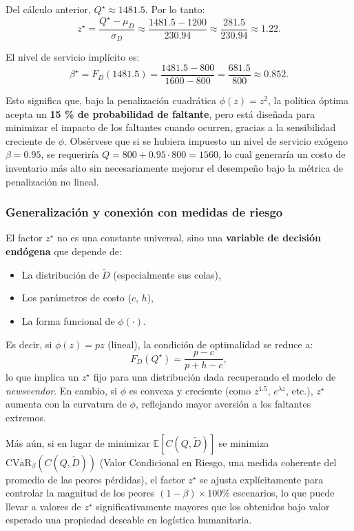 \documentclass[
  spanish,
  us-letterpaper,
]{scrreprt}
\providecommand{\tightlist}{%
  \setlength{\itemsep}{0pt}\setlength{\parskip}{0pt}}
\numberwithin{equation}{section}
\begin{document}
Del cálculo anterior, \(Q^\star \approx 1481.5\). Por lo tanto: \[
z^\star = \frac{Q^\star - \mu_D}{\sigma_D} \approx \frac{1481.5 - 1200}{230.94} \approx \frac{281.5}{230.94} \approx 1.22.
\]

El nivel de servicio implícito es: \[
\beta^\star = F_D(1481.5) = \frac{1481.5 - 800}{1600 - 800} = \frac{681.5}{800} \approx 0.852.
\]

Esto significa que, bajo la penalización cuadrática \(\phi(z) = z^2\),
la política óptima acepta un \textbf{15 \% de probabilidad de faltante},
pero está diseñada para minimizar el impacto de los faltantes cuando
ocurren, gracias a la sensibilidad creciente de \(\phi\). Obsérvese que
si se hubiera impuesto un nivel de servicio exógeno \(\beta = 0.95\), se
requeriría \(Q = 800 + 0.95 \cdot 800 = 1560\), lo cual generaría un
costo de inventario más alto sin necesariamente mejorar el desempeño
bajo la métrica de penalización no lineal.

\subsubsection{Generalización y conexión con medidas de
riesgo}\label{generalizaciuxf3n-y-conexiuxf3n-con-medidas-de-riesgo}

El factor \(z^\star\) no es una constante universal, sino una
\textbf{variable de decisión endógena} que depende de:

\begin{itemize}
\tightlist
\item
  La distribución de \(\tilde{D}\) (especialmente sus colas),
\item
  Los parámetros de costo (\(c\), \(h\)),
\item
  La forma funcional de \(\phi(\cdot)\).
\end{itemize}

Es decir, si \(\phi(z) = p z\) (lineal), la condición de optimalidad se
reduce a: \[
F_D(Q^\star) = \frac{p - c}{p + h - c},
\] lo que implica un \(z^\star\) fijo para una distribución dada
recuperando el modelo de \emph{newsvendor}. En cambio, si \(\phi\) es
convexa y creciente (como \(z^{1.5}\), \(e^{\lambda z}\), etc.),
\(z^\star\) aumenta con la curvatura de \(\phi\), reflejando mayor
aversión a los faltantes extremos.

Más aún, si en lugar de minimizar \(\mathbb{E}[C(Q,\tilde{D})]\) se
minimiza \(\text{CVaR}_\beta(C(Q,\tilde{D}))\) (Valor Condicional en
Riesgo, una medida coherente del promedio de las peores pérdidas), el
factor \(z^\star\) se ajusta explícitamente para controlar la magnitud
de los peores \((1 - \beta) \times 100\%\) escenarios, lo que puede
llevar a valores de \(z^\star\) significativamente mayores que los
obtenidos bajo valor esperado una propiedad deseable en logística
humanitaria.
\end{document}
